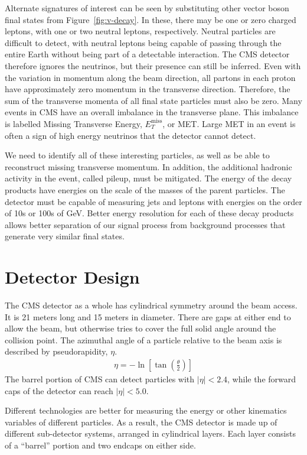Alternate signatures of interest can be seen by substituting other vector boson final states
from Figure~\ref{fig:v-decay}.
In these, there may be one or zero charged leptons,
with one or two neutral leptons, respectively.
Neutral particles are difficult to detect,
with neutral leptons being capable of passing through the entire Earth without
being part of a detectable interaction.
The CMS detector therefore ignores the neutrinos,
but their presence can still be inferred.
Even with the variation in momentum along the beam direction,
all partons in each proton have approximately zero momentum in the transverse direction.
Therefore, the sum of the transverse momenta of all final state particles must also be zero.
Many events in CMS have an overall imbalance in the transverse plane.
This imbalance is labelled Missing Transverse Energy, $E^\textrm{miss}_T$, or MET.
Large MET in an event is often a sign of high energy neutrinos that the detector cannot detect.

We need to identify all of these interesting particles,
as well as be able to reconstruct missing transverse momentum.
In addition, the additional hadronic activity in the event, called pileup, must be mitigated.
The energy of the decay products have energies on the scale of the masses of the parent particles.
The detector must be capable of measuring jets and leptons with energies on the
order of 10s or 100s of GeV.
Better energy resolution for each of these decay products allows better separation
of our signal process from background processes that generate very similar final states.

\section{Detector Design}

The CMS detector as a whole has cylindrical symmetry around the beam access.
It is 21 meters long and 15 meters in diameter.
There are gaps at either end to allow the beam,
but otherwise tries to cover the full solid angle around the collision point.
The azimuthal angle of a particle relative to the beam axis is described
by pseudorapidity, $\eta$.
\begin{gather}
  \eta = -\ln \left[\tan \left( \frac \theta 2 \right) \right]
\end{gather}
The barrel portion of CMS can detect particles with $|\eta| < 2.4$,
while the forward caps of the detector can reach $|\eta| < 5.0$.

Different technologies are better for measuring the energy
or other kinematics variables of different particles.
As a result, the CMS detector is made up of different sub-detector systems,
arranged in cylindrical layers.
Each layer consists of a ``barrel'' portion and two endcaps on either side.


